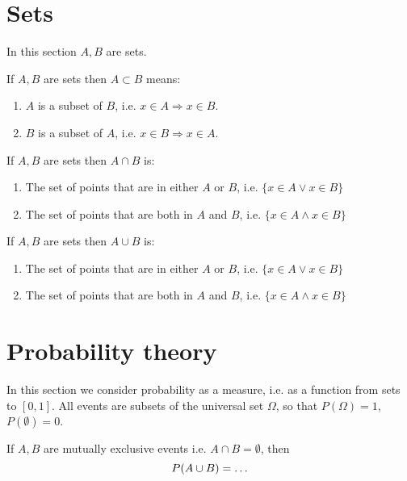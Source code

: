\documentclass[a4paper]{article}
\begin{document}
\section{Sets}
In this section $A, B$ are sets.

\begin{exercise}
  If $A, B$ are sets then
  $A \subset B$ means:
  \begin{enumerate}
  \item $A$ is a subset of $B$, i.e. $x \in A \Rightarrow x \in B$.
  \item $B$ is a subset of $A$, i.e. $x \in B \Rightarrow x \in A$.
  \end{enumerate}
\end{exercise}


\begin{exercise}
  If $A, B$ are sets then
  $A \cap B$ is:
  \begin{enumerate}
  \item The set of points that are in either $A$ or $B$, i.e. $\{x \in A \vee x \in B\}$
  \item The set of points that are both in $A$ and $B$, i.e. $\{x \in A \wedge x \in B\}$ 
  \end{enumerate}
\end{exercise}

\begin{exercise}
  If $A, B$ are sets then
  $A \cup B$ is:
  \begin{enumerate}
  \item The set of points that are in either $A$ or $B$, i.e. $\{x \in A \vee x \in B\}$
  \item The set of points that are both in $A$ and $B$, i.e. $\{x \in A \wedge x \in B\}$ 
  \end{enumerate}
\end{exercise}



\section{Probability theory}
In this section we consider probability as a measure, i.e. as a function from sets to $[0,1]$. All events are subsets of the universal set $\Omega$, so that $P(\Omega) = 1$, $P(\emptyset) = 0$.
\begin{exercise}
  If $A, B$ are mutually exclusive events i.e. $A \cap B = \emptyset$,  then 
  \[
  P(A \cup B) =
  \ifdefined \solution
  P(A) + P(B)
  \else
  \ldots
  \fi
  \]
\end{exercise}
\end{document}
